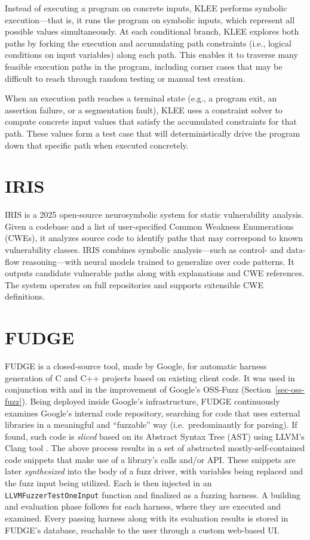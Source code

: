 \documentclass[
  a4paper,
]{scrreprt}
\theoremstyle{definition}
\theoremstyle{remark}
\begin{document}
Instead of executing a program on concrete inputs, KLEE performs
symbolic execution---that is, it runs the program on symbolic inputs,
which represent all possible values simultaneously. At each conditional
branch, KLEE explores both paths by forking the execution and
accumulating path constraints (i.e., logical conditions on input
variables) along each path. This enables it to traverse many feasible
execution paths in the program, including corner cases that may be
difficult to reach through random testing or manual test creation.

When an execution path reaches a terminal state (e.g., a program exit,
an assertion failure, or a segmentation fault), KLEE uses a constraint
solver to compute concrete input values that satisfy the accumulated
constraints for that path. These values form a test case that will
deterministically drive the program down that specific path when
executed concretely.

\section{IRIS}\label{iris}

IRIS \autocite{iris} is a 2025 open-source neurosymbolic system for
static vulnerability analysis. Given a codebase and a list of
user-specified Common Weakness Enumerations (CWEs), it analyzes source
code to identify paths that may correspond to known vulnerability
classes. IRIS combines symbolic analysis---such as control- and
data-flow reasoning---with neural models trained to generalize over code
patterns. It outputs candidate vulnerable paths along with explanations
and CWE references. The system operates on full repositories and
supports extensible CWE definitions.

\section{FUDGE}\label{fudge}

FUDGE \autocite{fudge} is a closed-source tool, made by Google, for
automatic harness generation of C and C++ projects based on existing
client code. It was used in conjunction with and in the improvement of
Google's OSS-Fuzz \autocite{oss-fuzz} (Section~\ref{sec-oss-fuzz}).
Being deployed inside Google's infrastructure, FUDGE continuously
examines Google's internal code repository, searching for code that uses
external libraries in a meaningful and ``fuzzable'' way
(i.e.~predominantly for parsing). If found, such code is \emph{sliced}
\autocite{sasirekha2011Slicing} based on its Abstract Syntax Tree (AST)
using LLVM's Clang tool \autocite{llvm}. The above process results in a
set of abstracted mostly-self-contained code snippets that make use of a
library's calls and/or API. These snippets are later \emph{synthesized}
into the body of a fuzz driver, with variables being replaced and the
fuzz input being utilized. Each is then injected in an
\texttt{LLVMFuzzerTestOneInput} function and finalized as a fuzzing
harness. A building and evaluation phase follows for each harness, where
they are executed and examined. Every passing harness along with its
evaluation results is stored in FUDGE's database, reachable to the user
through a custom web-based UI.
\end{document}
